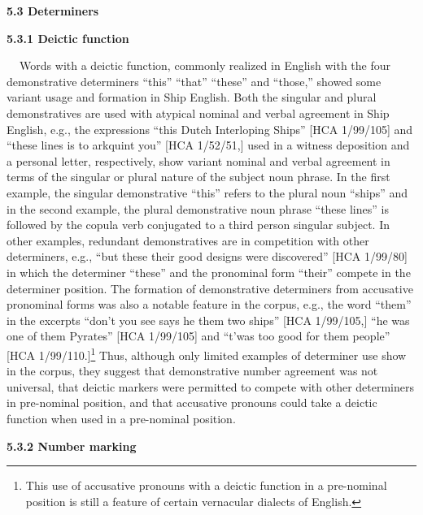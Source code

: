 \begin{styleStandard}
\textbf{5.3 Determiners}
\end{styleStandard}


\begin{styleStandard}
\textbf{5.3.1 Deictic function}
\end{styleStandard}


\begin{styleStandard}
\textbf{\ \ }Words with a deictic function, commonly realized in English with the four demonstrative determiners “this” “that” “these” and “those,” showed some variant usage and formation in Ship English. Both the singular and plural demonstratives are used with atypical nominal and verbal agreement in Ship English, e.g., the expressions “this Dutch Interloping Ships” [HCA 1/99/105] and “these lines is to arkquint you” [HCA 1/52/51,] used in a witness deposition and a personal letter, respectively, show variant nominal and verbal agreement in terms of the singular or plural nature of the subject noun phrase. In the first example, the singular demonstrative “this” refers to the plural noun “ships” and in the second example, the plural demonstrative noun phrase “these lines” is followed by the copula verb conjugated to a third person singular subject. In other examples, redundant demonstratives are in competition with other determiners, e.g., “but these their good designs were discovered” [HCA 1/99/80] in which the determiner “these” and the pronominal form “their” compete in the determiner position. The formation of demonstrative determiners from accusative pronominal forms was also a notable feature in the corpus, e.g., the word “them” in the excerpts “don’t you see says he them two ships” [HCA 1/99/105,] “he was one of them Pyrates” [HCA 1/99/105] and “t’was too good for them people” [HCA 1/99/110.]\footnote{ This use of accusative pronouns with a deictic function in a pre-nominal position is still a feature of certain vernacular dialects of English.} Thus, although only limited examples of determiner use show in the corpus, they suggest that demonstrative number agreement was not universal, that deictic markers were permitted to compete with other determiners in pre-nominal position, and that accusative pronouns could take a deictic function when used in a pre-nominal position. \ 
\end{styleStandard}


\begin{styleStandard}
\textbf{5.3.2 Number marking}
\end{styleStandard}


